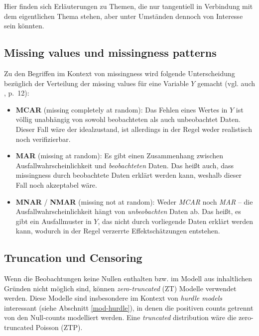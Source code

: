\documentclass[ngerman,a4paper,]{scrartcl}
\providecommand{\tightlist}{%
  \setlength{\itemsep}{0pt}\setlength{\parskip}{0pt}}
\theoremstyle{definition}
\theoremstyle{definition}
\theoremstyle{definition}
\theoremstyle{remark}
\begin{document}
Hier finden sich Erläuterungen zu Themen, die nur tangentiell in Verbindung mit dem eigentlichen Thema stehen, aber unter Umständen dennoch von Interesse sein könnten.

\hypertarget{appendix-missingness}{%
\subsection{Missing values und missingness patterns}\label{appendix-missingness}}

Zu den Begriffen im Kontext von missingness wird folgende Unterscheidung bezüglich der Verteilung der missing values für eine Variable \(Y\) gemacht (vgl. auch \citet{littleStatisticalAnalysisMissing2002}, p.~12):

\begin{itemize}
\tightlist
\item
  \textbf{MCAR} (missing completely at random): Das Fehlen eines Wertes in \(Y\) ist völlig unabhängig von sowohl beobachteten als auch unbeobachtet Daten. Dieser Fall wäre der idealzustand, ist allerdings in der Regel weder realistisch noch verifizierbar.
\item
  \textbf{MAR} (missing at random): Es gibt einen Zusammenhang zwischen Ausfallwahrscheinlichkeit und \emph{beobachteten} Daten. Das heißt auch, dass missingness durch beobachtete Daten erklärt werden kann, weshalb dieser Fall noch akzeptabel wäre.
\item
  \textbf{MNAR} / \textbf{NMAR} (missing not at random): Weder \emph{MCAR} noch \emph{MAR} -- die Ausfallwahrscheinlichkeit hängt von \emph{unbeobachten} Daten ab. Das heißt, es gibt ein Ausfallmuster in \(Y\), das nicht durch vorliegende Daten erklärt werden kann, wodurch in der Regel verzerrte Effektschätzungen entstehen.
\end{itemize}

\hypertarget{trunc-cens}{%
\subsection{Truncation und Censoring}\label{trunc-cens}}

Wenn die Beobachtungen keine Nullen enthalten bzw. im Modell aus inhaltlichen Gründen nicht möglich sind, können \emph{zero-truncated} (ZT) Modelle verwendet werden. Diese Modelle sind insbesondere im Kontext von \emph{hurdle models} interessant (siehe Abschnitt \ref{mod-hurdle}), in denen die positiven counts getrennt von den Null-counts modelliert werden. Eine \emph{truncated} distribution wäre die zero-truncated Poisson (ZTP).
\end{document}

